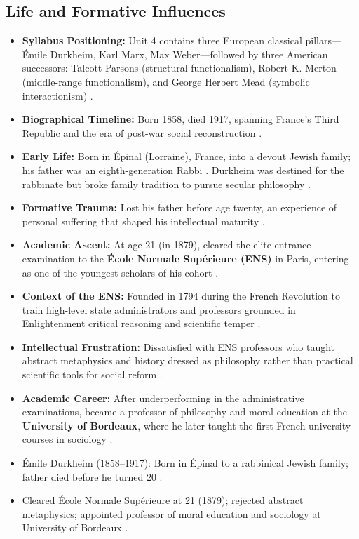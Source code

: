 \subsection{Life and Formative Influences}
\begin{itemize}
    \item \textbf{Syllabus Positioning:} Unit 4 contains three European classical pillars---Émile Durkheim, Karl Marx, Max Weber---followed by three American successors: Talcott Parsons (structural functionalism), Robert K. Merton (middle-range functionalism), and George Herbert Mead (symbolic interactionism) .
    \item \textbf{Biographical Timeline:} Born 1858, died 1917, spanning France's Third Republic and the era of post-war social reconstruction .
    \item \textbf{Early Life:} Born in Épinal (Lorraine), France, into a devout Jewish family; his father was an eighth-generation Rabbi . Durkheim was destined for the rabbinate but broke family tradition to pursue secular philosophy .
    \item \textbf{Formative Trauma:} Lost his father before age twenty, an experience of personal suffering that shaped his intellectual maturity .
    \item \textbf{Academic Ascent:} At age 21 (in 1879), cleared the elite entrance examination to the \textbf{École Normale Supérieure (ENS)} in Paris, entering as one of the youngest scholars of his cohort .
    \item \textbf{Context of the ENS:} Founded in 1794 during the French Revolution to train high-level state administrators and professors grounded in Enlightenment critical reasoning and scientific temper .
    \item \textbf{Intellectual Frustration:} Dissatisfied with ENS professors who taught abstract metaphysics and history dressed as philosophy rather than practical scientific tools for social reform .
    \item \textbf{Academic Career:} After underperforming in the administrative examinations, became a professor of philosophy and moral education at the \textbf{University of Bordeaux}, where he later taught the first French university courses in sociology .
\end{itemize}

\begin{QuickRevision}
\begin{itemize}
    \item Émile Durkheim (1858--1917): Born in Épinal to a rabbinical Jewish family; father died before he turned 20 .
    \item Cleared École Normale Supérieure at 21 (1879); rejected abstract metaphysics; appointed professor of moral education and sociology at University of Bordeaux .
\end{itemize}
\end{QuickRevision}


